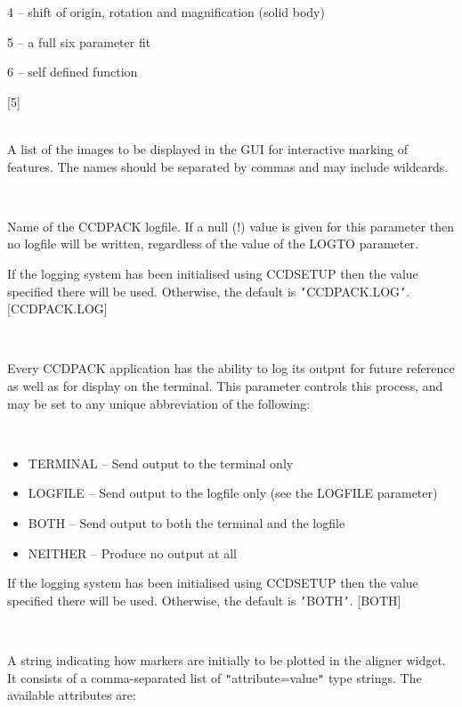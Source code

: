 \documentclass[twoside,11pt]{article}
\newcommand{\htmlref}[2]{#1}
\renewcommand{\_}{\texttt{\symbol{95}}}
\newcommand{\xroutine}[1]{\htmlref{{\sc #1}}{#1}}
\newcommand{\sstsubsection}[1]{ \item[{#1}] \mbox{} \\}
\newcommand{\sstitemlist}[1]{
  \mbox{} \\
  \vspace{-3.5ex}
  \begin{itemize}
     #1
  \end{itemize}
}
\newcommand{\sstitem}{\item}
\newcommand{\sstsubsection}[1]{\item[{#1}]}
\newcommand{\sstitemlist}[1]{
      \begin{itemize}
         #1
      \end{itemize}
      \\
   }
\newcommand{\sstitem}{\item}
\begin{document}
{{{{            \sstitem
               4 -- shift of origin, rotation and magnification (solid body)

            \sstitem
               5 -- a full six parameter fit

            \sstitem
               6 -- self defined function

         }
         [5]
      }
      \sstsubsection{
         IN = LITERAL (Read)
      }{
         A list of the images to be displayed in the GUI for interactive
         marking of features.  The names should be separated by commas
         and may include wildcards.
      }
      \sstsubsection{
         LOGFILE = FILENAME (Read)
      }{
         Name of the CCDPACK logfile.  If a null (!) value is given for
         this parameter then no logfile will be written, regardless of
         the value of the LOGTO parameter.

         If the logging system has been initialised using \xroutine{CCDSETUP}
         then the value specified there will be used. Otherwise, the
         default is {\tt '}CCDPACK.LOG{\tt '}.
         [CCDPACK.LOG]
      }
      \sstsubsection{
         LOGTO = LITERAL (Read)
      }{
         Every CCDPACK application has the ability to log its output
         for future reference as well as for display on the terminal.
         This parameter controls this process, and may be set to any
         unique abbreviation of the following:
         \sstitemlist{

            \sstitem
               TERMINAL  -- Send output to the terminal only

            \sstitem
               LOGFILE   -- Send output to the logfile only (see the
                               LOGFILE parameter)

            \sstitem
               BOTH      -- Send output to both the terminal and the
                               logfile

            \sstitem
               NEITHER   -- Produce no output at all

         }
         If the logging system has been initialised using \xroutine{CCDSETUP}
         then the value specified there will be used. Otherwise, the
         default is {\tt '}BOTH{\tt '}.
         [BOTH]
      }
      \sstsubsection{
         MARKSTYLE = LITERAL (Read and Write)
      }{
         A string indicating how markers are initially to be plotted in
         the aligner widget.  It consists of a comma-separated list of
         {\tt "}attribute=value{\tt "} type strings.  The available attributes are:
         \sstitemlist{

}}}}
\end{document}
